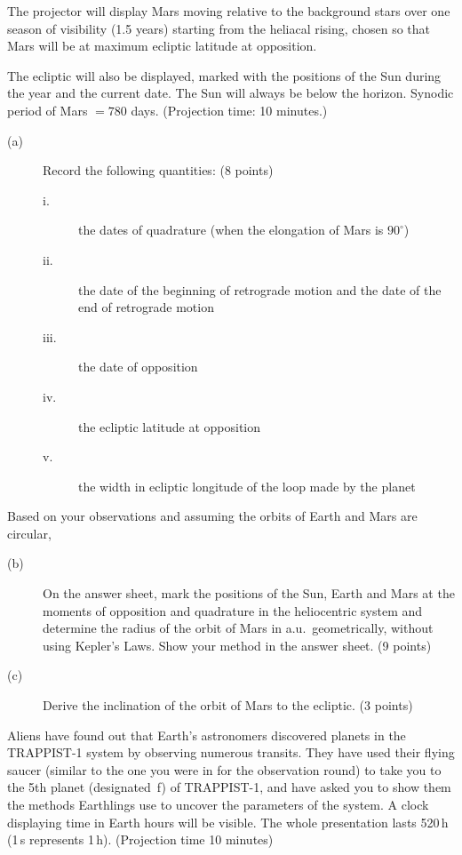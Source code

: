 The projector will display Mars moving relative to the background stars over
one season of visibility (1.5 years) starting from the heliacal rising, chosen
so that Mars will be at maximum ecliptic latitude at opposition.

The ecliptic will also be displayed, marked with the positions of the Sun
during the year and the current date. The Sun will always be below the
horizon. Synodic period of Mars $= 780$ days. (Projection time: 10 minutes.)

\begin{description}
\item[(a)] Record the following quantities: \hfill(8 points)
  \begin{description}
  \item[i.] the dates of quadrature (when the elongation of Mars is $90^\circ$)
  \item[ii.] the date of the beginning of retrograde motion and the date of
    the end of retrograde motion
  \item[iii.] the date of opposition
  \item[iv.] the ecliptic latitude at opposition
  \item[v.] the width in ecliptic longitude of the loop made by the planet
  \end{description}
\end{description}

Based on your observations and assuming the orbits of Earth and Mars are
circular,
\begin{description}
\item[(b)] On the answer sheet, mark the positions of the Sun, Earth and Mars
  at the moments of opposition and quadrature in the heliocentric system and
  determine the radius of the orbit of Mars in a.u.\ geometrically, without
  using Kepler's Laws. Show your method in the answer sheet. \hfill(9 points)
\item[(c)] Derive the inclination of the orbit of Mars to the ecliptic.
  \hfill(3 points)
\end{description}

Aliens have found out that Earth's astronomers discovered planets in the
TRAPPIST-1 system by observing numerous transits. They have used their flying
saucer (similar to the one you were in for the observation round) to take you
to the 5th planet (designated~f) of TRAPPIST-1, and have asked you to show
them the methods Earthlings use to uncover the parameters of the system. A
clock displaying time in Earth hours will be visible. The whole presentation
lasts 520\,h (1\,s represents 1\,h). (Projection time 10 minutes)

